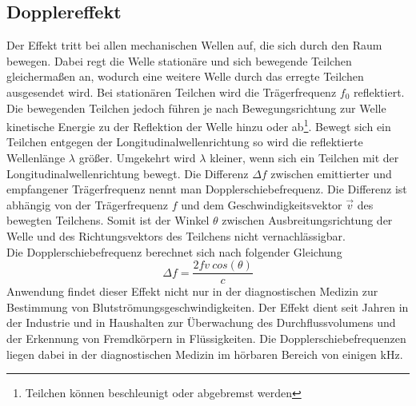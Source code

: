 \subsection{Dopplereffekt}\label{sec:dopplereffekt}
Der Effekt tritt bei allen mechanischen Wellen auf, die sich durch den Raum bewegen. Dabei regt die Welle stationäre und sich bewegende Teilchen gleichermaßen an, wodurch eine weitere Welle durch das erregte Teilchen ausgesendet wird. Bei stationären Teilchen wird die Trägerfrequenz $f_0$ reflektiert. Die bewegenden Teilchen jedoch führen je nach Bewegungsrichtung zur Welle kinetische Energie zu der Reflektion der Welle hinzu oder ab\footnote{Teilchen können beschleunigt oder abgebremst werden}. Bewegt sich ein Teilchen entgegen der Longitudinalwellenrichtung so wird die reflektierte Wellenlänge $\lambda$ größer. Umgekehrt wird $\lambda$ kleiner, wenn sich ein Teilchen mit der Longitudinalwellenrichtung bewegt.\newline
Die Differenz $\Delta f$ zwischen emittierter und empfangener Trägerfrequenz nennt man Dopplerschiebefrequenz. Die Differenz ist abhängig von der Trägerfrequenz $f$ und dem Geschwindigkeitsvektor $\overrightarrow{v}$ des bewegten Teilchens. Somit ist der Winkel $\theta$ zwischen Ausbreitungsrichtung der Welle und des Richtungsvektors des Teilchens nicht vernachlässigbar.\\
Die Dopplerschiebefrequenz berechnet sich nach folgender Gleichung
\begin{equation}
\Delta f=\dfrac{2fv\ cos(\theta)}{c}
\end{equation}
Anwendung findet dieser Effekt nicht nur in der diagnostischen Medizin zur Bestimmung von Blutströmungsgeschwindigkeiten. Der Effekt dient seit Jahren in der Industrie und in Haushalten zur Überwachung des Durchflussvolumens und der Erkennung von Fremdkörpern in Flüssigkeiten. Die Dopplerschiebefrequenzen liegen dabei in der diagnostischen Medizin im hörbaren Bereich von einigen kHz.
